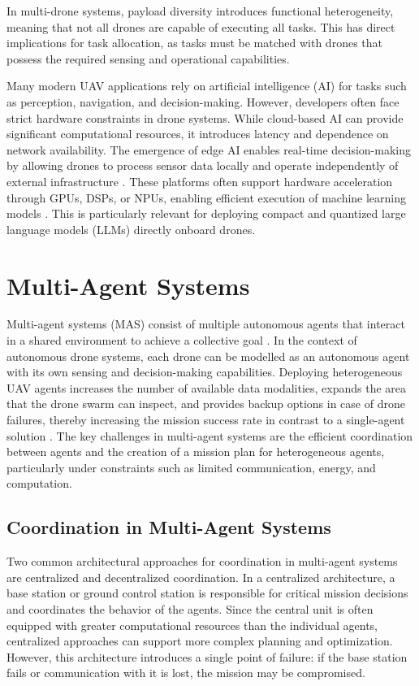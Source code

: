 In multi-drone systems, payload diversity introduces functional heterogeneity, meaning that not all drones are capable of executing all tasks. 
This has direct implications for task allocation, as tasks must be matched with drones that possess the required sensing and operational capabilities.

Many modern UAV applications rely on artificial intelligence (AI) for tasks such as perception, navigation, and decision-making. 
However, developers often face strict hardware constraints in drone systems. While cloud-based AI can provide significant computational resources, it introduces latency and 
dependence on network availability.
The emergence of edge AI enables real-time decision-making by allowing drones to process sensor data locally and operate independently of external infrastructure
\cite{mcenroe2022edgeaiuav}. These platforms often support hardware acceleration through GPUs, DSPs, or NPUs, enabling efficient execution of machine learning models \cite{modalai2024companion}.
This is particularly relevant for deploying compact and quantized large language models (LLMs) directly onboard drones.

\section{Multi-Agent Systems}

Multi-agent systems (MAS) consist of multiple autonomous agents that interact in a shared environment to achieve a collective goal \cite{wooldridge2002multiagent}. 
In the context of autonomous drone systems, each drone can be modelled as an autonomous agent with its own sensing and decision-making capabilities.
Deploying heterogeneous UAV agents increases the number of available data modalities, expands the area that the drone swarm can inspect, and provides backup options in case of
drone failures, thereby increasing the mission success rate in contrast to a single-agent solution \cite{pantelimon2019survey}.
The key challenges in multi-agent systems are the efficient coordination between agents and the creation of a mission plan for heterogeneous agents,
particularly under constraints such as limited communication, energy, and computation.

\subsection{Coordination in Multi-Agent Systems}

Two common architectural approaches for coordination in multi-agent systems are centralized and decentralized coordination.
In a centralized architecture, a base station or ground control station is responsible for critical mission decisions and coordinates the behavior of the agents. 
Since the central unit is often equipped with greater computational resources than the individual agents, centralized approaches can support more complex planning and optimization. 
However, this architecture introduces a single point of failure: if the base station fails or communication with it is lost, the mission may be compromised.

